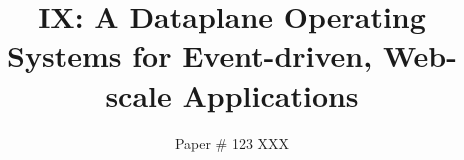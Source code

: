 \documentclass[10pt,twocolumn]{article}
\begin{document}
\title{\bf IX: A Dataplane Operating Systems for \break Event-driven, Web-scale Applications}


\author{Paper \# 123 XXX}
\date{}
\maketitle
\thispagestyle{empty}













 


\end{document}

